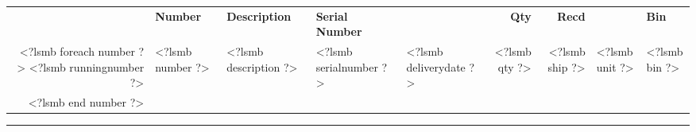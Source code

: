 \documentclass[twoside]{scrartcl}
\begin{document}
\begin{tabularx}{\textwidth}{@{}rlXllrrll@{}}
\vspace{1cm}
  
\begin{tabularx}{\textwidth}{@{}rlXllrrll@{}}
  \textbf{Pos} & \textbf{Number} & \textbf{Description} & \textbf{Serial Number} & & \textbf{Qty} & \textbf{Recd} & & \textbf{Bin} \\

<?lsmb foreach number ?>
  <?lsmb runningnumber ?> & <?lsmb number ?> & <?lsmb description ?> & <?lsmb serialnumber ?> &
  <?lsmb deliverydate ?> & <?lsmb qty ?> & <?lsmb ship ?> & <?lsmb unit ?> & <?lsmb bin ?> \\
<?lsmb end number ?>
\end{tabularx}


\rule{\textwidth}{2pt}
\end{document}
